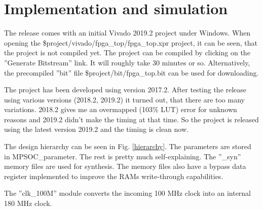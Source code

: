 \chapter{Implementation and simulation}

The release comes with an initial Vivado 2019.2 project under Windows. When opening the \$project/vivado/fpga\_top/fpga\_top.xpr project, it can be seen, that the project is not compiled yet. The project can be compiled by clicking on the ''Generate Bitstream'' link. It will roughly take 30 minutes or so. Alternatively, the precompiled ''bit'' file \$project/bit/fpga\_top.bit can be used for downloading.

The project has been developed using version 2017.2. After testing the release using various versions (2018.2, 2019.2) it turned out, that there are too many variations. 2018.2 gives me an overmapped (103\% LUT) error for unknown reasons and 2019.2 didn't make the timing at that time. So the project is released using the latest version 2019.2 and the timing is clean now.

The design hierarchy can be seen in Fig. \ref{hierarchy}. The parameters are stored in MPSOC\_parameter. The rest is pretty much self-explaining. The ''\_syn'' memory files are used for synthesis. The memory files also have a bypass data register implemented to improve the RAMs write-through capabilities.

The ''clk\_100M'' module converts the incoming 100 MHz clock into an internal 180 MHz clock.

